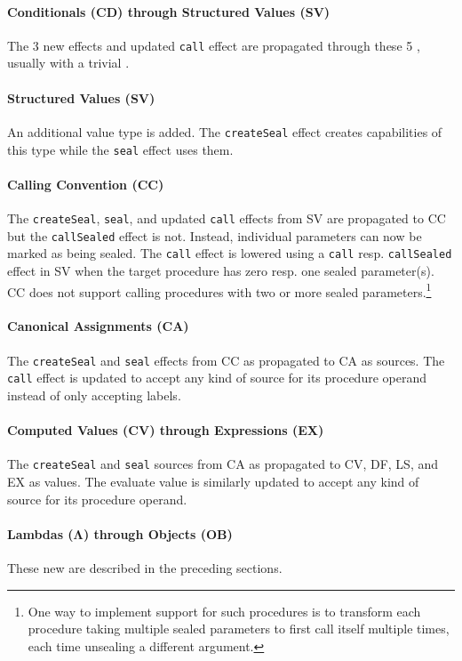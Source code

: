 \documentclass[main.tex]{subfiles}
\begin{document}
\paragraph{Conditionals (CD) through Structured Values (SV)} The 3 new effects and updated \texttt{call} effect are propagated through these 5 , usually with a trivial .

\paragraph{Structured Values (SV)} An additional  value type is added. The \texttt{createSeal} effect creates capabilities of this type while the \texttt{seal} effect uses them.

\paragraph{Calling Convention (CC)} The \texttt{createSeal}, \texttt{seal}, and updated \texttt{call} effects from SV are propagated to CC but the \texttt{callSealed} effect is not. Instead, individual parameters can now be marked as being sealed. The \texttt{call} effect is lowered using a \texttt{call} resp. \texttt{callSealed} effect in SV when the target procedure has zero resp. one sealed parameter(s). CC does not support calling procedures with two or more sealed parameters.\footnote{One way to implement support for such procedures is to transform each procedure taking multiple sealed parameters to first call itself multiple times, each time unsealing a different argument.}

\paragraph{Canonical Assignments (CA)} The \texttt{createSeal} and \texttt{seal} effects from CC as propagated to CA as sources. The \texttt{call} effect is updated to accept any kind of source for its procedure operand instead of only accepting labels.

\paragraph{Computed Values (CV) through Expressions (EX)} The \texttt{createSeal} and \texttt{seal} sources from CA as propagated to CV, DF, LS, and EX as values. The evaluate value is similarly updated to accept any kind of source for its procedure operand.

\paragraph{Lambdas (Λ) through Objects (OB)} These new  are described in the preceding sections.
\end{document}
